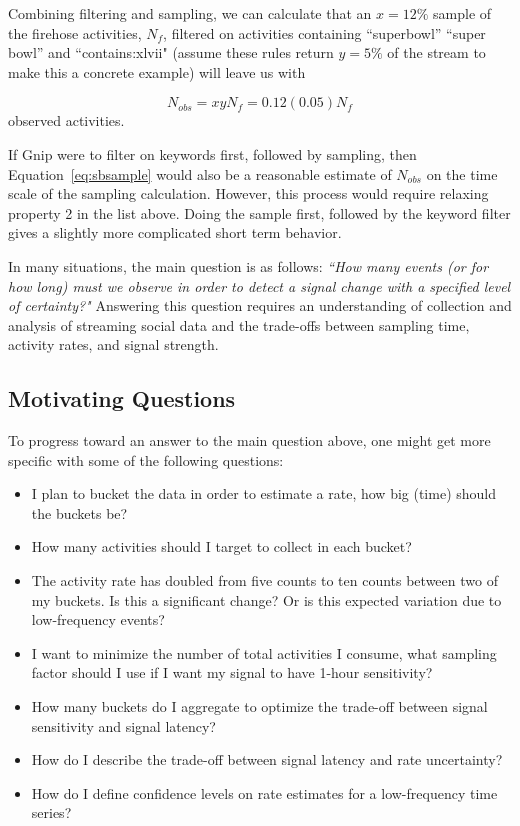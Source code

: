 \documentclass{article}
\begin{document}
Combining filtering and sampling, we can calculate that an $x=12\%$ sample of the firehose activities, $N_f$, filtered on activities containing ``superbowl'' ``super bowl'' and ``contains:xlvii" (assume these rules return $y=5\%$ of the stream to make this a concrete example) will leave us with


\begin{equation}
    \label{eq:sbsample}
    N_{obs} = x y N_f = 0.12 (0.05) N_f
\end{equation}
observed activities. 

If Gnip were to filter on keywords first, followed by sampling, then Equation~\ref{eq:sbsample} would also be a reasonable estimate of $N_{obs}$ on the time scale of the sampling calculation. However, this process would require relaxing property 2 in the list above. 
Doing the sample first, followed by the keyword filter gives a slightly more complicated short term behavior.


In many situations, the main question is as follows: \emph{``How many events (or for how long) must we observe in order to detect a signal change with a specified level of certainty?"} Answering this question requires an understanding of collection and analysis of streaming social data and the trade-offs between sampling time, activity rates, and signal strength. 


\subsection{Motivating Questions} 

To progress toward an answer to the main question above, one might get more specific with some of the following questions:

\begin{itemize}
\item I plan to bucket the data in order to estimate a rate, how big (time) should the buckets be? 
\item How many activities should I target to collect in each bucket?
\item The activity rate has doubled from five counts to ten counts between two of my buckets. Is this a significant change? Or is this expected variation due to low-frequency events?
\item I want to minimize the number of total activities I consume, what sampling factor should I use if I want my signal to have 1-hour sensitivity?
\item How many buckets do I aggregate to optimize the trade-off between signal sensitivity and signal latency?
\item How do I describe the trade-off between signal latency and rate uncertainty?
\item How do I define confidence levels on rate estimates for a low-frequency time series?
\end{itemize}
\end{document}
